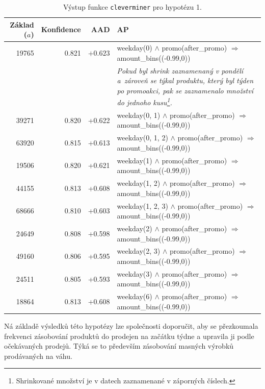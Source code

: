     \begin{table}[h!]
        \begin{center}
                \captionsetup{justification=centering}
        \caption{Výstup funkce \texttt{cleverminer} pro hypotézu 1.}
        \begin{tabular}{rrrp{7.5cm}}
            Základ ($a$) & Konfidence & AAD & AP \\
            \midrule
19765 & 0.821 & $+0.623$ & weekday(0) $\land$ promo(after\_promo) $\Rightarrow$ amount\_bins((-0.99,0)) \\
& & & {\footnotesize{\textit{Pokud byl shrink zaznamenaný v pondělí a~zároveň se týkal produktu, který byl týden po promoakci, pak se zaznamenalo množství do jednoho kusu\footnote{Shrinkované množství je v datech zaznamenané v záporných číslech.}. }}} \\
39271 & 0.820 & +0.622 & weekday(0, 1)  $\land$ promo(after\_promo) $\Rightarrow$ amount\_bins((-0.99,0)) \\
63920 & 0.815 & +0.613 & weekday(0, 1, 2)  $\land$ promo(after\_promo) $\Rightarrow$ amount\_bins((-0.99,0)) \\
19506 & 0.820 & +0.621 & weekday(1)  $\land$ promo(after\_promo) $\Rightarrow$ amount\_bins((-0.99,0)) \\
44155 & 0.813 & +0.608 & weekday(1, 2)  $\land$ promo(after\_promo) $\Rightarrow$ amount\_bins((-0.99,0)) \\
68666 & 0.810 & +0.603 & weekday(1, 2, 3)  $\land$ promo(after\_promo) $\Rightarrow$ amount\_bins((-0.99,0)) \\
24649 & 0.808 & +0.598 & weekday(2)  $\land$ promo(after\_promo) $\Rightarrow$ amount\_bins((-0.99,0)) \\
49160 & 0.806 & +0.595 & weekday(2, 3)  $\land$ promo(after\_promo) $\Rightarrow$ amount\_bins((-0.99,0)) \\
24511 & 0.805 & +0.593 &weekday(3) $\land$ promo(after\_promo) $\Rightarrow$ amount\_bins((-0.99,0)) \\
18864 & 0.813 & +0.608 &weekday(6)  $\land$ promo(after\_promo) $\Rightarrow$ amount\_bins((-0.99,0)) \\
    \end{tabular}
\label{tab:H1vysl}
\end{center}
\end{table}

Ná základě výsledků této hypotézy lze společnosti doporučit, aby se přezkoumala frekvenci zásobování produktů do prodejen na začátku týdne a upravila ji podle očekávaných prodejů. Týká se to především zásobování masných výrobků prodávaných na váhu.

